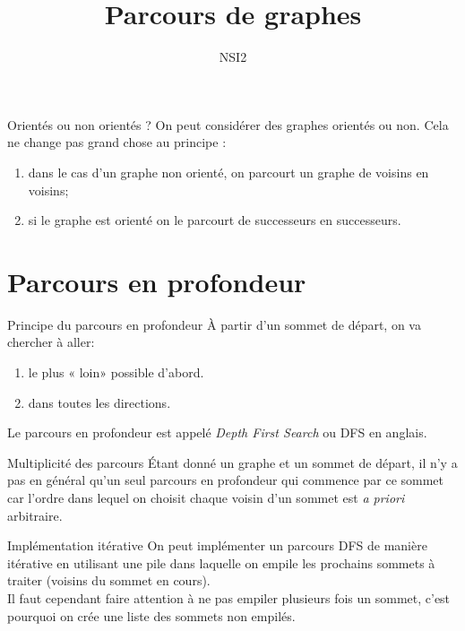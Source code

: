 \documentclass[10pt]{beamer}
\title{Parcours de graphes}
\author{NSI2}
\begin{document}
\maketitle

\begin{frame}{Orientés ou non orientés ?}
On peut considérer des graphes orientés ou non. Cela ne change pas grand chose au principe :
\begin{enumerate}[--]
	\item dans le cas d'un graphe non orienté, on parcourt un graphe de voisins en voisins;
    \item si le graphe est orienté on le parcourt de successeurs en successeurs.
\end{enumerate}
\end{frame}

\section*{Parcours en profondeur}
\begin{frame}{Principe du parcours en profondeur}
À partir d'un sommet de départ, on va chercher à aller:
\begin{enumerate}
	\item le plus « loin» possible d'abord.
    \item dans toutes les directions.
\end{enumerate}
Le parcours en profondeur est appelé \textit{Depth First Search} ou DFS en anglais.
\end{frame}
\begin{frame}{Multiplicité des parcours}
\'Etant donné un graphe et un sommet de départ, il n'y a pas en général qu'un seul parcours en profondeur qui commence par ce sommet car l'ordre dans lequel on choisit chaque voisin d'un
sommet est \textit{a priori} arbitraire.
\end{frame}
\begin{frame}{Implémentation itérative}
On peut implémenter un parcours DFS de manière itérative en utilisant une \alert{pile} dans laquelle on empile les prochains sommets à traiter (voisins du sommet en cours).\\
Il faut cependant faire attention à ne pas empiler plusieurs fois un sommet, c'est pourquoi on crée une liste des sommets non empilés.
\end{frame}
\end{document}
